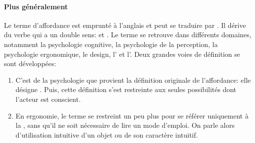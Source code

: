         \paragraph{Plus généralement}
            Le terme d'affordance est emprunté à l’anglais et peut se traduire par . Il dérive du verbe  qui a un double sens:  et .
            Le terme se retrouve dans différents domaines, notamment la psychologie cognitive, la psychologie de la perception, la psychologie ergonomique, le design, l' et l'. Deux grandes voies de définition se sont développées:
            \begin{enumerate}\myItemStyle
                \item C'est de la psychologie que provient la définition originale de l'affordance: elle désigne . Puis, cette définition s'est restreinte aux seules possibilités dont l'acteur est conscient.
                \item En ergonomie, le terme se restreint un peu plus pour se référer uniquement à la , \ie sans qu'il ne soit nécessaire de lire un mode d'emploi. On parle alors d'utilisation intuitive d'un objet ou de son caractère intuitif.
            \end{enumerate}{}
